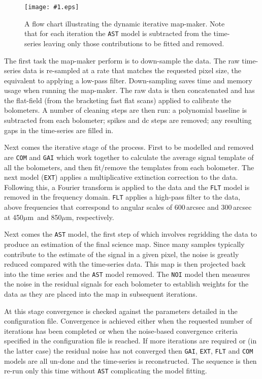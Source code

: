 \documentclass[twoside,11pt]{article}
\newcommand{\htmladdimg}[1]{}
\renewcommand{\_}{\texttt{\symbol{95}}}
\newcommand{\myfig}[5]{
  \begin{figure}#2
    \centering\texttt{[image: \#1.eps]}
    \typeout{#1.eps inserted on page \arabic{page}}
    \caption{\label{#4}\small #5}
  \end{figure}
}
\newcommand{\myfig}[5]{
    \label{#4} \htmladdimg{#1.png}\\
    \\
    Figure: #5\\
  }
\newcommand{\micron}{\mbox{$\mu$m}}
\begin{document}
\myfig{sc21_flow_dimm_blue}{}{width=0.78\linewidth}{fig:dimm}{
  A flow chart illustrating the dynamic iterative map-maker. Note that
  for each iteration the \texttt{AST} model is subtracted from the
  time-series leaving only those contributions to be fitted and
  removed.}

The first task the map-maker perform is to down-sample the data. The
raw time-series data is re-sampled at a rate that matches the
requested pixel size, the equivalent to applying a low-pass filter.
Down-sampling saves time and memory usage when running the map-maker.
The raw data is then concatenated and has the flat-field (from the
bracketing fast flat scans) applied to calibrate the bolometers. A
number of cleaning steps are then run: a polynomial baseline is
subtracted from each bolometer; spikes and dc steps are removed; any
resulting gaps in the time-series are filled in.

Next comes the iterative stage of the process. First to be modelled
and removed are \texttt{COM} and \texttt{GAI} which work together to
calculate the average signal template of all the bolometers, and then
fit/remove the templates from each bolometer. The next model
(\texttt{EXT}) applies a multiplicative extinction correction to the
data.  Following this, a Fourier transform is applied to the data and
the \texttt{FLT} model is removed in the frequency domain.
\texttt{FLT} applies a high-pass filter to the data, above frequencies
that correspond to angular scales of 600\,arcsec and 300\,arcsec at
450\micron\ and 850\micron, respectively.

Next comes the \texttt{AST} model, the first step of which involves
regridding the data to produce an estimation of the final science map.
Since many samples typically contribute to the estimate of the signal
in a given pixel, the noise is greatly reduced compared with the
time-series data. This map is then projected back into the time series
and the \texttt{AST} model removed. The \texttt{NOI} model then
measures the noise in the residual signals for each bolometer to
establish weights for the data as they are placed into the map in
subsequent iterations.

At this stage convergence is checked against the parameters detailed
in the configuration file.  Convergence is achieved either when the
requested number of iterations has been completed or when the
noise-based convergence criteria specified in the configuration file
is reached. If more iterations are required or (in the latter case)
the residual noise has not converged then \texttt{GAI}, \texttt{EXT},
\texttt{FLT} and \texttt{COM} models are all un-done and the
time-series is reconstructed. The sequence is then re-run only this
time without \texttt{AST} complicating the model fitting.
\end{document}
